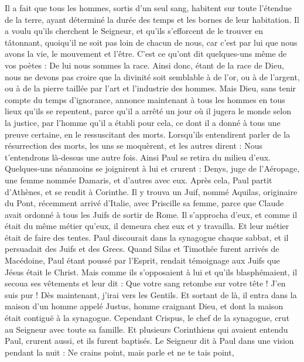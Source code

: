 \begin{multicols}{2}
Il a fait que tous les hommes, sortis d’un seul sang, habitent sur toute l'étendue de la terre, ayant déterminé la durée des temps et les bornes de leur habitation.
Il a voulu qu'ils cherchent le Seigneur, et qu’ils s’efforcent de le trouver en tâtonnant, quoiqu'il ne soit pas loin de chacun de nous,
car c’est par lui que nous avons la vie, le mouvement et l'être. C’est ce qu’ont dit quelques-uns même de vos poètes : De lui nous sommes la race.
Ainsi donc, étant de la race de Dieu, nous ne devons pas croire que la divinité soit semblable à de l'or, ou à de l'argent, ou à de la pierre taillée par l'art et l'industrie des hommes.
Mais Dieu, sans tenir compte du temps d’ignorance, annonce maintenant à tous les hommes en tous lieux qu'ils se repentent,
parce qu'il a arrêté un jour où il jugera le monde selon la justice, par l'homme qu'il a établi pour cela, ce dont il a donné à tous une preuve certaine, en le ressuscitant des morts.
Lorsqu’ils entendirent parler de la résurrection des morts, les uns se moquèrent, et les autres dirent : Nous t'entendrons là-dessus une autre fois.
Ainsi Paul se retira du milieu d'eux.
Quelques-uns néanmoins se joignirent à lui et crurent : Denys, juge de l’Aéropage, une femme nommée Damaris, et d’autres avec eux.
\VerseOne{}Après cela, Paul partit d'Athènes, et se rendit à Corinthe.
Il y trouva un Juif, nommé Aquilas, originaire du Pont, récemment arrivé d'Italie, avec Priscille sa femme, parce que Claude avait ordonné à tous les Juifs de sortir de Rome. Il s’approcha d’eux,
et comme il était du même métier qu’eux, il demeura chez eux et y travailla. Et leur métier était de faire des tentes.
Paul discourait dans la synagogue chaque sabbat, et il persuadait des Juifs et des Grecs.
Quand Silas et Timothée furent arrivés de Macédoine, Paul étant poussé par l'Esprit, rendait témoignage aux Juifs que Jésus était le Christ.
Mais comme ils s’opposaient à lui et qu'ils blasphémaient, il secoua ses vêtements et leur dit : Que votre sang retombe sur votre tête ! J’en suis pur ! Dès maintenant, j’irai vers les Gentils.
Et sortant de là, il entra dans la maison d'un homme appelé Justus, homme craignant Dieu, et dont la maison était contiguë à la synagogue.
Cependant Crispus, le chef de la synagogue, crut au Seigneur avec toute sa famille. Et plusieurs Corinthiens qui avaient entendu Paul, crurent aussi, et ils furent baptisés.
Le Seigneur dit à Paul dans une vision pendant la nuit : Ne crains point, mais parle et ne te tais point,

\end{multicols}
